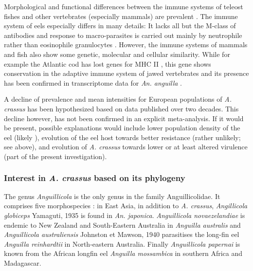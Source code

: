 Morphological and functional differences between the immune systems of
teleost fishes and other vertebrates (especially mammals) are
prevalent \cite{press1999morphology}. The immune system of eels
especially differs in many details: It lacks all but the M-class of
antibodies and response to macro-parasites is carried out mainly by
neutrophile rather than eosinophile granulocytes
\cite{nielsen_eel_2006}. However, the immune systems of mammals and
fish also show some genetic, molecular and cellular similarity. While
for example the Atlantic cod has lost genes for MHC II
\cite{pmid21832995}, this gene shows conservation in the adaptive
immune system of jawed vertebrates \cite{pmid21078341} and its
presence has been confirmed in transcriptome data for
\textit{An. anguilla} \cite{pmid17666525}.

A decline of prevalence and mean intensities for European populations
of \textit{A. crassus} has been hypothesized based on data published
over two decades. This decline however, has not been confirmed in an
explicit meta-analysis. If it would be present, possible explanations
would include lower population density of the eel (likely
\cite{schabuss_dynamics_2005}), evolution of the eel host towards
better resistance (rather unlikely; see above), and evolution of
\textit{A. crassus} towards lower or at least altered virulence (part
of the present investigation).

\subsubsection{Interest in \textit{A. crassus} based on its
    phylogeny}
\label{phyl-int}

The genus \textit{Anguillicola} is the only genus in the family
Anguillicolidae. It comprises five morphospecies
\cite{taraschewski_revision_1988}: in East Asia, in addition to
\textit{A. crassus}, \textit{Angillicola globiceps} Yamaguti, 1935
\cite{yamaguti_globiceps} is found in \textit{An.
  japonica}. \textit{Anguillicola novaezelandiae} is endemic to New
Zealand and South-Eastern Australia in \textit{Anguilla australis} and
\textit{Anguillicola australiensis} Johnston et Mawson, 1940
\cite{johnston1940some} parasitises the long-fin eel \textit{Anguilla
  reinhardtii} in North-eastern Australia. Finally
\textit{Anguillicola papernai} is known from the African longfin eel
\textit{Anguilla mossambica} in southern Africa and Madagascar.


